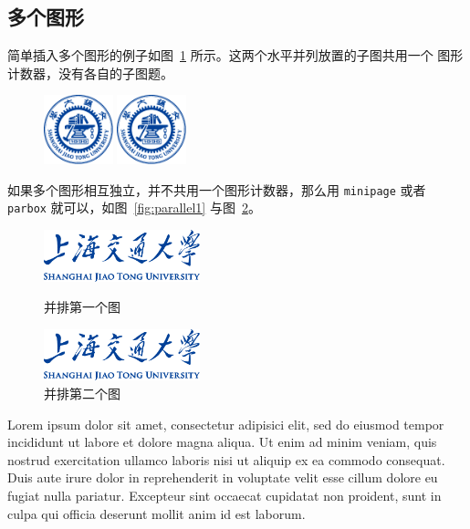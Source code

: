\subsection{多个图形}

简单插入多个图形的例子如图~\ref{fig:SRR} 所示。这两个水平并列放置的子图共用一个
图形计数器，没有各自的子图题。

\begin{figure}[!htp]
  \centering
  \includegraphics[height=2cm]{pdf/sjtu-badge.pdf}
  \hspace{1cm}
  \includegraphics[height=2cm]{pdf/sjtu-badge.pdf}
  \label{fig:SRR}
\end{figure}

如果多个图形相互独立，并不共用一个图形计数器，那么用 \texttt{minipage} 或者
\texttt{parbox} 就可以，如图~\ref{fig:parallel1} 与图~\ref{fig:parallel2}。

\begin{figure}[!htp]
\begin{minipage}{0.48\textwidth}
  \centering
  \includegraphics[height=1.5cm]{pdf/sjtu-name.pdf}
  \caption{并排第一个图}
  \label{fig:parallel1}
\end{minipage}\hfill
\begin{minipage}{0.48\textwidth}
  \centering
  \includegraphics[height=1.5cm]{pdf/sjtu-name.pdf}
  \caption{并排第二个图}
  \label{fig:parallel2}
\end{minipage}
\end{figure}

Lorem ipsum dolor sit amet, consectetur adipisici elit, sed do eiusmod tempor
incididunt ut labore et dolore magna aliqua. Ut enim ad minim veniam, quis
nostrud exercitation ullamco laboris nisi ut aliquip ex ea commodo consequat.
Duis aute irure dolor in reprehenderit in voluptate velit esse cillum dolore eu
fugiat nulla pariatur. Excepteur sint occaecat cupidatat non proident, sunt in
culpa qui officia deserunt mollit anim id est laborum.

